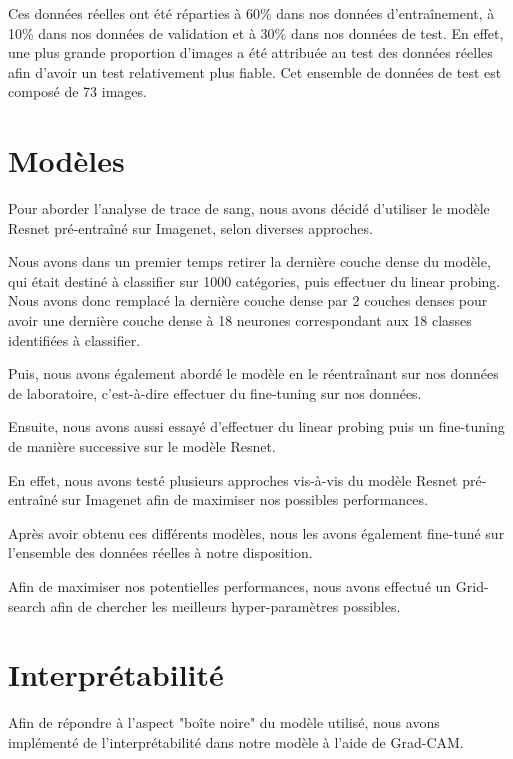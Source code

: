 \documentclass[a4paper]{llncs}
\begin{document}
Ces données réelles ont été réparties à 60\% dans nos données d'entraînement, à 10\% dans nos données de validation et à 30\% dans nos données de test. En effet, une plus grande proportion d'images a été attribuée au test des données réelles afin d'avoir un test relativement plus fiable. Cet ensemble de données de test est composé de 73 images. 



\section{Modèles}

Pour aborder l'analyse de trace de sang, nous avons décidé d'utiliser le modèle Resnet pré-entraîné sur Imagenet, selon diverses approches.

Nous avons dans un premier temps retirer la dernière couche dense du modèle, qui était destiné à classifier sur 1000 catégories, puis effectuer du linear probing. Nous avons donc remplacé la dernière couche dense par 2 couches denses pour avoir une dernière couche dense à 18 neurones correspondant aux 18 classes identifiées à classifier. 

Puis, nous avons également abordé le modèle en le réentraînant sur nos données de laboratoire, c'est-à-dire effectuer du fine-tuning sur nos données. 

Ensuite, nous avons aussi essayé d'effectuer du linear probing puis un fine-tuning de manière successive sur le modèle Resnet. 

En effet, nous avons testé plusieurs approches vis-à-vis du modèle Resnet pré-entraîné sur Imagenet afin de maximiser nos possibles performances. 

Après avoir obtenu ces différents modèles, nous les avons également fine-tuné sur l'ensemble des données réelles à notre disposition. 


Afin de maximiser nos potentielles performances, nous avons effectué un Grid-search afin de chercher les meilleurs hyper-paramètres possibles. 

\section{Interprétabilité}

Afin de répondre à l'aspect "boîte noire" du modèle utilisé, nous avons implémenté de l'interprétabilité dans notre modèle à l'aide de Grad-CAM. 
\end{document}
